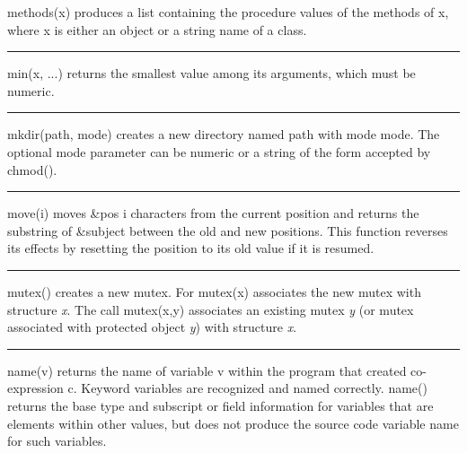\noindent
\textsf{methods(x)} produces a list containing the procedure values of
the methods of x, where x is either an object or a string name of a
class.

\bigskip\hrule\vspace{0.1cm}

\noindent
{}\textsf{min(x, ...)} returns the smallest value among its
arguments, which must be numeric.

\bigskip\hrule\vspace{0.1cm}

\noindent
{}\textsf{mkdir(path,
mode)} creates a new directory named \textsf{path} with mode
\textsf{mode}. The optional \textsf{mode} parameter can be numeric or a
string of the form accepted by \textsf{chmod()}.

\bigskip\hrule\vspace{0.1cm}

\noindent
{}\textsf{move(i)} moves \textsf{\&pos} \textsf{i}
characters from the current position and returns the substring of
\textsf{\&subject} between the old and new positions. This function
reverses its effects by resetting the position to its old value if it
is resumed.

\bigskip\hrule\vspace{0.1cm}

\noindent
{}\textsf{mutex()} creates a new mutex. For \textsf{mutex(x)}
associates the new mutex with structure {\textit x}.
The call {\textsf mutex(x,y)} associates an existing mutex \textit{y} (or
mutex associated with protected object \textit{y}) with
structure {\textit x}.

\bigskip\hrule\vspace{0.1cm}

\noindent
{}\textsf{name(v)} returns the name of variable \textsf{v}
within the program that created co-expression \textsf{c}. Keyword
variables are recognized and named correctly. \textsf{name()} returns
the base type and subscript or field information for variables that are
elements within other values, but does not produce the source code
variable name for such variables. 

